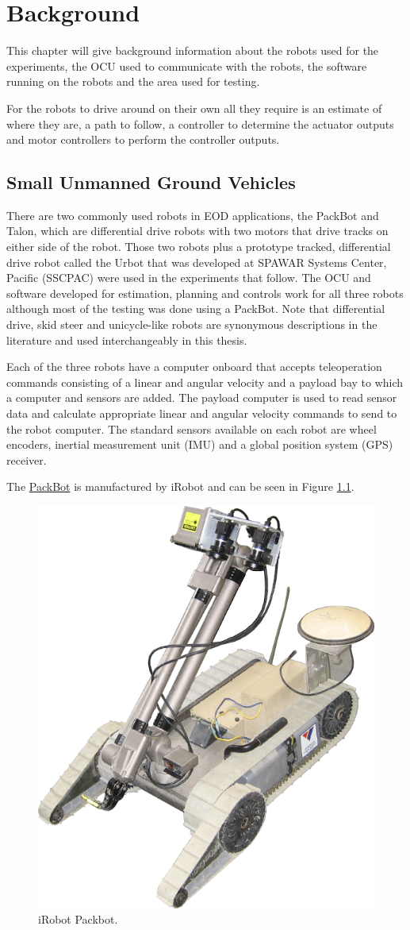 \chapter{Background}
\label{ch:background}
This chapter will give background information about the robots used for the experiments, the OCU used to communicate with the robots, the software running on the robots and the area used for testing.

For the robots to drive around on their own all they require is an estimate of where they are, a path to follow, a controller to determine the actuator outputs and motor controllers to perform the controller outputs.

\section{Small Unmanned Ground Vehicles}
\label{sec:smallugvs}
There are two commonly used robots in EOD applications, the PackBot and Talon, which are differential drive robots with two motors that drive tracks on either side of the robot. Those two robots plus a prototype tracked, differential drive robot called the Urbot that was developed at SPAWAR Systems Center, Pacific (SSCPAC) were used in the experiments that follow. The OCU and software developed for estimation, planning and controls work for all three robots although most of the testing was done using a PackBot. Note that differential drive, skid steer and unicycle-like robots are synonymous descriptions in the literature and used interchangeably in this thesis.

Each of the three robots have a computer onboard that accepts teleoperation commands consisting of a linear and angular velocity and a payload bay to which a computer and sensors are added. The payload computer is used to read sensor data and calculate appropriate linear and angular velocity commands to send to the robot computer. The standard sensors available on each robot are wheel encoders, inertial measurement unit (IMU) and a global position system (GPS) receiver.

The \href{http://www.irobot.com/sp.cfm?pageid=171}{PackBot} is manufactured by iRobot and can be seen in Figure \ref{fig:packbot}.

\begin{figure}[ht!]
	\centering
	\includegraphics[width=.3\textwidth]{images/packbot}
	\caption{iRobot Packbot.}
	\label{fig:packbot}
\end{figure}

